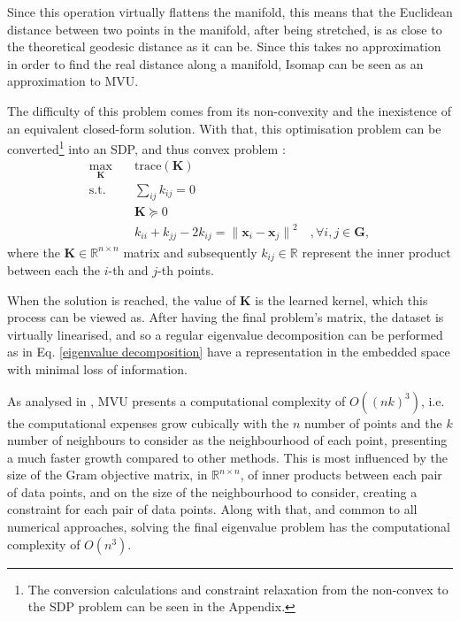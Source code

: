     Since this operation virtually flattens the manifold, this means that the Euclidean distance between two points in the manifold, after being stretched, is as close to the theoretical geodesic distance as it can be. Since this takes no approximation in order to find the real distance along a manifold, Isomap can be seen as an approximation to MVU.
    
    The difficulty of this problem comes from its non-convexity and the inexistence of an equivalent closed-form solution. With that, this optimisation problem can be converted\footnote{The conversion calculations and constraint relaxation from the non-convex to the SDP problem can be seen in the Appendix.} into an SDP, and thus convex problem \cite{mvu}:
    \begin{align}
        \max_{\bm{K}} \quad & \text{trace}(\bm{K}) \\
        \textrm{s.t.} \quad 
            & \sum_{ij} k_{ij} = 0 \\
            & \bm{K} \succeq 0 \\
            & k_{ii} + k_{jj} -2k_{ij} = {\| \bm{x}_i - \bm{x}_j \|}^2 \quad , \forall{i,j}\in\bm{G},
    \end{align}
    where the $\bm{K}\in\mathbb{R}^{n\times n}$ matrix and subsequently $k_{ij}\in\mathbb{R}$ represent the inner product between each the $i$-th and $j$-th points.

    When the solution is reached, the value of $\bm{K}$ is the learned kernel, which this process can be viewed as. After having the final problem's matrix, the dataset is virtually linearised,
    and so a regular eigenvalue decomposition can be performed as in Eq. \ref{eigenvalue decomposition} have a representation in the embedded space with minimal loss of information.

    As analysed in \cite{cube}, MVU presents a computational complexity of $O((nk)^3)$, i.e. the computational expenses grow cubically with the $n$ number of points and the $k$ number of neighbours to consider as the neighbourhood of each point, presenting a much faster growth compared to other methods. This is most influenced by the size of the Gram objective matrix, in $\mathbb{R}^{n\times n}$, of inner products between each pair of data points, and on the size of the neighbourhood to consider, creating a constraint for each pair of data points. Along with that, and common to all numerical approaches, solving the final eigenvalue problem has the computational complexity of $O(n^3)$. %

















